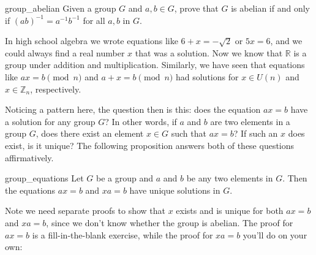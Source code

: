 \begin{exercise}{group_abelian}
Given a group $G$ and $a, b \in G$, prove that $G$ is abelian if and only if $(ab)^{-1} =a^{-1}b^{-1}$ for all $a,b$ in $G$.
\end{exercise}
 
In high school algebra we wrote equations like $6 + x = -\sqrt{2}$ or $5x = 6$, and we could always find a real number $x$ that was a solution.  Now we know that ${\mathbb R}$ is a group under addition and multiplication.  Similarly, we have seen that  equations like $ax = b \pmod{n}$ and $a + x = b \pmod{n}$ had solutions for $x \in U(n)$ and $x \in {\mathbb Z}_n$, respectively. 

Noticing a pattern here, the question then is this:  does the equation $ax = b$ have a solution for any group $G$? 
In other words, if $a$ and $b$ are two elements in a group $G$, does there 
exist an element $x \in G$ such that $ax = b$? If such an $x$ does
exist, is it unique? The following proposition answers both of these
questions affirmatively. 
  
\begin{prop}{group_equations}
Let $G$ be a group and $a$ and $b$ be any two elements in $G$. Then
the equations $ax = b$ and $xa = b$ have unique solutions in $G$. 
\end{prop}

\noindent
Note we need separate proofs to show that $x$ exists and is unique for both $ax =b$ and $xa = b$, since we don't know whether the group is abelian.  The proof for $ax=b$ is a fill-in-the-blank exercise, while the proof for $xa=b$ you'll do on your own:

